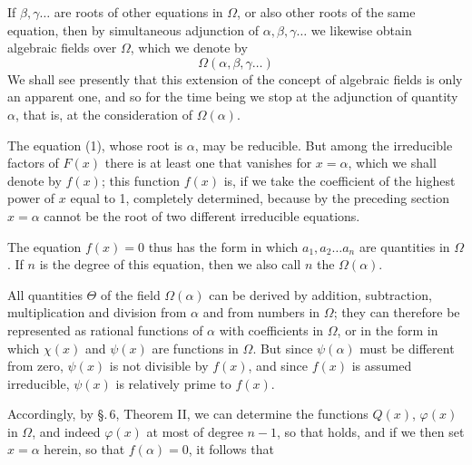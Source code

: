 
If $\beta, \gamma \ldots$ are roots of other equations in $\Omega$, or also other roots of the same equation, then by simultaneous adjunction of $\alpha, \beta, \gamma \ldots$ we likewise obtain algebraic fields over $\Omega$, which we denote by
\[ \Omega(\alpha, \beta, \gamma \ldots) \]
We shall see presently that this extension of the concept of algebraic fields is only an apparent one, and so for the time being we stop at the adjunction of  quantity $\alpha$, that is, at the consideration of $\Omega(\alpha)$.

The equation (1), whose root is $\alpha$, may be reducible. But among the irreducible factors of $F(x)$ there is at least one that vanishes for $x = \alpha$, which we shall denote by $f(x)$; this function $f(x)$ is, if we take the coefficient of the highest power of $x$ equal to 1, completely determined, because by the preceding section $x = \alpha$ cannot be the root of two different irreducible equations.

The equation $f(x) = 0$ thus has the form
in which $a_1, a_2 \ldots a_n$ are quantities in $\Omega$. If $n$ is the degree of this equation, then we also call $n$ the  $\Omega(\alpha)$.

All quantities $\Theta$ of the field $\Omega(\alpha)$ can be derived by addition, subtraction, multiplication and division from $\alpha$ and from numbers in $\Omega$; they can therefore be represented as rational functions of $\alpha$ with coefficients in $\Omega$, or in the form
in which $\chi(x)$ and $\psi(x)$ are functions in $\Omega$. But since $\psi(\alpha)$ must be different from zero, $\psi(x)$ is not divisible by $f(x)$, and since $f(x)$ is assumed irreducible, $\psi(x)$ is relatively prime to $f(x)$.

Accordingly, by \S.\,6, Theorem II, we can determine the functions $Q(x)$, $\varphi(x)$ in $\Omega$, and indeed $\varphi(x)$ at most of degree $n - 1$, so that
holds, and if we then set $x = \alpha$ herein, so that $f(\alpha) = 0$, it follows that
